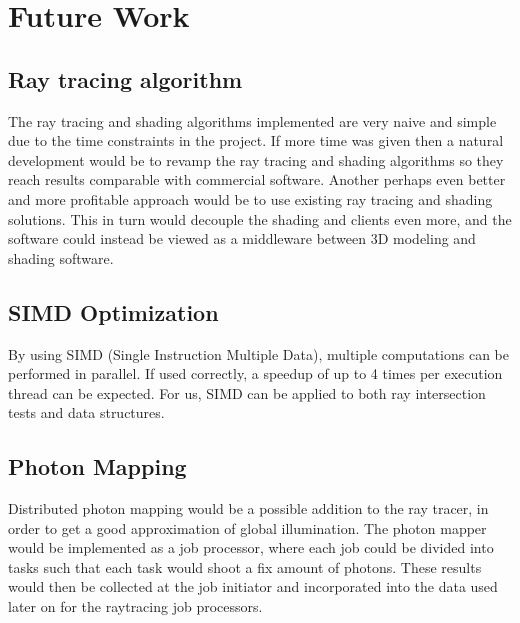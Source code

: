 % 

\chapter{Future Work}
\section{Ray tracing algorithm}
The ray tracing and shading algorithms implemented are very naive and simple due to the time constraints in the project. If more time was given then a natural development would be to revamp the ray tracing and shading algorithms so they reach results comparable with commercial software. Another perhaps even better and more profitable approach would be to use existing ray tracing and shading solutions. This in turn would decouple the shading and clients even more, and the software could instead be viewed as a middleware between 3D modeling and shading software.

\section{SIMD Optimization}
By using SIMD (Single Instruction Multiple Data), multiple computations can be performed in parallel. If used correctly, a speedup of up to 4 times per execution thread can be expected. For us, SIMD can be applied to both ray intersection tests and data structures.


\section{Photon Mapping}
Distributed photon mapping would be a possible addition to the ray tracer, in order to get a good approximation of global illumination. The photon mapper would be implemented as a job processor, where each job could be divided into tasks such that each task would shoot a fix amount of photons. These results would then be collected at the job initiator and incorporated into the data used later on for the raytracing job processors.

